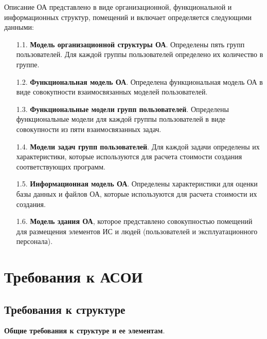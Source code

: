 \documentclass[12pt, a4paper, simple]{eskdtext}
\begin{document}
    Описание ОА представлено в виде организационной, функциональной и информационных
структур, помещений и включает определяется следующими данными:

    \begin{enumerate}
        \item[1.1.] \textbf{Модель организационной структуры ОА}.
        Определены пять групп пользователей.
        Для каждой группы пользователей определено их количество в группе.
        \item[1.2.] \textbf{Функциональная модель ОА}.
        Определена функциональная модель ОА в виде совокупности взаимосвязанных моделей пользователей.
        \item[1.3.] \textbf{Функциональные модели групп пользователей}.
        Определены функциональные модели для каждой группы пользователей
        в виде совокупности из пяти взаимосвязанных задач.
        \item[1.4.] \textbf{Модели задач групп пользователей}.
        Для каждой задачи определены их характеристики,
        которые используются для расчета стоимости создания соответствующих программ.
        \item[1.5.] \textbf{Информационная модель ОА}.
        Определены характеристики для оценки базы данных и файлов ОА,
        которые используются для расчета стоимости их создания.
        \item[1.6.] \textbf{Модель здания ОА}, которое представлено совокупностью помещений
        для размещения элементов ИС и людей (пользователей и эксплуатационного персонала).
    \end{enumerate}

    \section{Требования к АСОИ}

    \subsection{Требования к структуре} 

    \textbf{Общие требования к структуре и ее элементам}.
\end{document}
